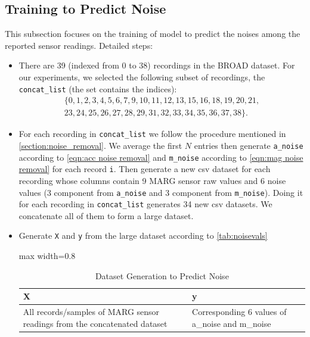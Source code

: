 \documentclass{iutbscthesis}
\begin{document}
\subsection{Training to Predict Noise}\label{subsec:predictnoise}
This subsection focuses on the training of model to predict the noises among the reported sensor readings. Detailed steps:
\begin{itemize}
    \item There are 39 (indexed from 0 to 38) recordings in the BROAD dataset. For our experiments, we selected the following subset of recordings, the \texttt{concat\_list} (the set contains the indices):
    \begin{multline*}
    \{0,1,2,3,4,5,6,7,9,10,11,12,13,15,16,18,19,20,21, \\
    23,24,25,26,27,28,29,31,32,33,34,35,36,37,38\}.
    \end{multline*}
    
    
    
    \item For each recording in \texttt{concat\_list} we follow the procedure mentioned in \autoref{section:noise_removal}. We average the first $N$ entries then generate \texttt{a\_noise} according to \autoref{eqn:acc noise removal} and \texttt{m\_noise} according to \autoref{eqn:mag noise removal} for each record \texttt{i}. Then generate a new csv dataset for each recording whose columns contain 9 MARG sensor raw values and 6 noise values (3 component from \texttt{a\_noise} and 3 component from \texttt{m\_noise}). Doing it for each recording in \texttt{concat\_list} generates 34 new csv datasets. We concatenate all of them to form a large dataset.
    \item Generate \texttt{X} and \texttt{y} from the large dataset according to \autoref{tab:noisevals}
        \begin{table}[H]
        \centering
        \caption{Dataset Generation to Predict Noise}    \label{tab:noisevals}
            \begin{adjustbox}{max width=0.8\textwidth}
                \begin{tabular}{| p{} | p{} |}
                \hline
                \textbf{X} & \textbf{y} \\
                \hline
                All records/samples of MARG sensor readings from the concatenated dataset & Corresponding 6 values of a\_noise and m\_noise \\
                \hline
                \end{tabular}
            \end{adjustbox}
        \end{table}
    

\end{itemize}
\end{document}
